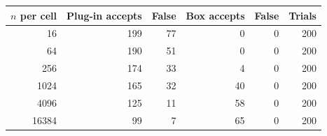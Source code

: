 \begin{tabular}{rrrrrr}
\toprule
$n$ per cell & Plug-in accepts & False & Box accepts & False & Trials \\
\midrule
16 & 199 & 77 & 0 & 0 & 200 \\
64 & 190 & 51 & 0 & 0 & 200 \\
256 & 174 & 33 & 4 & 0 & 200 \\
1024 & 165 & 32 & 40 & 0 & 200 \\
4096 & 125 & 11 & 58 & 0 & 200 \\
16384 & 99 & 7 & 65 & 0 & 200 \\
\bottomrule
\end{tabular}
